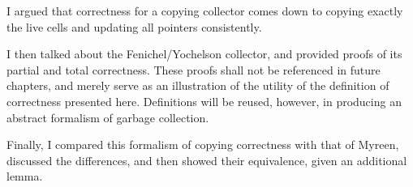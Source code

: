 I argued that correctness for a copying collector comes down to
copying exactly the live cells and updating all pointers consistently.

I then talked about the Fenichel/Yochelson\cite{Fenichel69} collector,
and provided proofs of its partial and total correctness. These proofs
shall not be referenced in future chapters, and merely serve as an
illustration of the utility of the definition of correctness presented
here. Definitions will be reused, however, in producing an abstract
formalism of garbage collection.

Finally, I compared this formalism of copying correctness with that of
Myreen\cite{Myreen10}, discussed the differences, and then showed
their equivalence, given an additional lemma.
